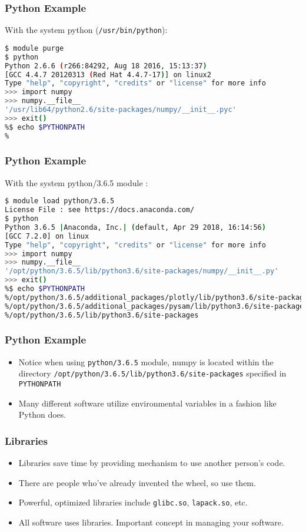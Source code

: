 \documentclass{beamer}
\newcommand{\code}[1]{\colorbox{codegray}{\texttt{#1}}}
\begin{document}
\begin{frame}[fragile]
\frametitle{Python Example}
With the system python (\code{/usr/bin/python}):
\begingroup
\scriptsize
\begin{lstlisting}[backgroundcolor = \color{codegray}, language = Bash, showstringspaces=false]
$ module purge
$ python
Python 2.6.6 (r266:84292, Aug 18 2016, 15:13:37)
[GCC 4.4.7 20120313 (Red Hat 4.4.7-17)] on linux2
Type "help", "copyright", "credits" or "license" for more info
>>> import numpy
>>> numpy.__file__
'/usr/lib64/python2.6/site-packages/numpy/__init__.pyc'
>>> exit()
%$ echo $PYTHONPATH
%
\end{lstlisting}
\endgroup
\end{frame}


\begin{frame}[fragile]
\frametitle{Python Example}
With the system python/3.6.5 module :
\begingroup
\scriptsize
\begin{lstlisting}[backgroundcolor = \color{codegray}, language = Bash, showstringspaces=false]
$ module load python/3.6.5
License File : see https://docs.anaconda.com/
$ python
Python 3.6.5 |Anaconda, Inc.| (default, Apr 29 2018, 16:14:56)
[GCC 7.2.0] on linux
Type "help", "copyright", "credits" or "license" for more info
>>> import numpy
>>> numpy.__file__
'/opt/python/3.6.5/lib/python3.6/site-packages/numpy/__init__.py'
>>> exit()
%$ echo $PYTHONPATH
%/opt/python/3.6.5/additional_packages/plotly/lib/python3.6/site-packages:
%/opt/python/3.6.5/additional_packages/pysam/lib/python3.6/site-packages:
%/opt/python/3.6.5/lib/python3.6/site-packages
\end{lstlisting}
\endgroup
\end{frame}


\begin{frame}
\frametitle{Python Example}
\begin{itemize}
    \item Notice when using \code{python/3.6.5} module, numpy is located within the directory \code{/opt/python/3.6.5/lib/python3.6/site-packages} specified in \code{PYTHONPATH} 
    \pause
    \item Many different software utilize environmental variables in a fashion like Python does.
\end{itemize}
\end{frame}


\begin{frame}
\frametitle{Libraries}
\begin{itemize}
    \item Libraries save time by providing mechanism to use another person's code.
    \bigskip
    \item There are people who've already invented the wheel, so use them.
    \bigskip
    \item Powerful, optimized libraries include \code{glibc.so}, \code{lapack.so}, etc.
    \bigskip
    \item All software uses libraries. Important concept in managing your software.
\end{itemize}
\end{frame}
\end{document}

